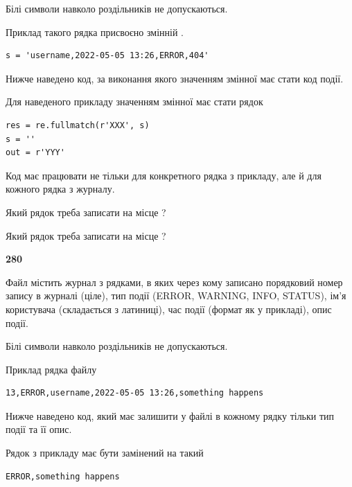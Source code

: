 Білі символи навколо роздільників не допускаються.

Приклад такого рядка присвоєно змінній .



\begin{verbatim}
s = 'username,2022-05-05 13:26,ERROR,404'
\end{verbatim}


Нижче наведено код, за виконання якого значенням змінної  має стати код події.

Для наведеного прикладу значенням змінної  має стати рядок 



\begin{verbatim}
res = re.fullmatch(r'XXX', s)
s = ''
out = r'YYY'
\end{verbatim}


Код має працювати не тільки для конкретного рядка з прикладу, але й для кожного рядка з журналу.




Який рядок треба записати на місце  ?\par
\vspace{5mm}


Який рядок треба записати на місце  ?\par


\newpage

{\begin {center}\textbf{ 280}\end {center}}\par
Файл  містить журнал з рядками, в яких через кому записано поряд\-ко\-вий номер запису в журналі (ціле), тип події (ERROR, WARNING, INFO, STATUS), ім'я користувача (складається з латиниці), час події (фор\-мат як у прикладі), опис події.

Білі символи навколо роздільників не допускаються.

Приклад рядка файлу



\begin{verbatim}
13,ERROR,username,2022-05-05 13:26,something happens
\end{verbatim}


Нижче наведено код, який має залишити у файлі в кожному рядку тільки тип події та її опис.

Рядок з прикладу має бути замінений на такий



\begin{verbatim}
ERROR,something happens
\end{verbatim}




